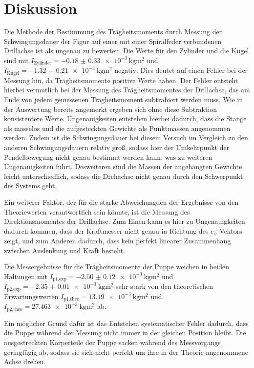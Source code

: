 \section{Diskussion}
\label{sec:Diskussion}

Die Methode der Bestimmung des Trägheitsmoments durch Messung der Schwingungsdauer
der Figur auf einer mit einer Spiralfeder verbundenen Drillachse ist als ungenau
zu bewerten.
Die Werte für den Zylinder und die Kugel sind mit $I_{\text{Zylinder}} = \SI{-0.18(033)e-3}{\kilogram\meter\squared}$
und $I_{\text{Kugel}}=\SI{-1.32(021)e-3}{\kilogram\meter\squared}$ negativ. Dies
deutet auf einen Fehler bei der Messung hin, da Trägheitsmomente positive Werte haben. Der Fehler entsteht
hierbei vermutlich bei der Messung des Trägheitsmomentes der Drillachse, das am Ende
von jedem gemessenen Trägheitsmoment subtrahiert werden muss. Wie in der Auswertung
bereits angemerkt ergeben sich ohne diese Subtraktion konsistentere Werte. Ungenauigkeiten entstehen
hierbei dadurch, dass die Stange als masselos und die aufgesteckten Gewichte als
Punktmassen angenommen werden. Zudem ist die Schwingungsdauer bei diesem Versuch
im Vergleich zu den anderen Schwingungsdauern relativ groß, sodass hier der Umkehrpunkt
der Pendelbewegung nicht genau bestimmt werden kann, was zu weiteren Ungenauigkeiten führt.
Desweiteren sind die Massen der angehängten Gewichte leicht unterschiedlich, sodass
die Drehachse nicht genau durch den Schwerpunkt des Systems geht.

Ein weiterer Faktor, der für die starke Abweichungden der Ergebnisse von den
Theoriewerten verantwortlich sein könnte, ist die Messung des Direktionsmomentes
der Drillachse. Zum Einen kann es hier zu Ungenauigkeiten dadurch kommen, dass der
Kraftmesser nicht genau in Richtung des $e_\mathrm{\phi}$ Vektors zeigt, und zum
Anderen dadurch, dass kein perfekt linearer Zusammenhang zwischen Auslenkung und Kraft
besteht.

Die Messergebnisse für die Trägheitsmomente der Puppe weichen in beiden Haltungen
mit $I_{\text{p1,exp}} = \SI{-2.50(012)e-3}{\kilogram\meter\squared}$ und
$I_{\text{p2,exp}} = \SI{-2.35(001)e-3}{\kilogram\meter\squared}$
sehr stark von den theoretischen Erwartungswerten $I_{\text{p1,theo}} = \SI{13.19e-3}{\kilogram\meter\squared}$
und $I_{\text{p2,theo}} = \SI{27.463e-3}{\kilogram\meter\squared}$ ab.

Ein möglicher Grund dafür ist das Entstehen systematischer Fehler dadurch,
dass die Puppe während der Messung nicht immer in der gleichen Position bleibt. Die ausgestreckten
Körperteile der Puppe sacken während des Messvorgangs geringfügig ab, sodass sie sich
nicht perfekt um ihre in der Theorie angenommene Achse drehen.

